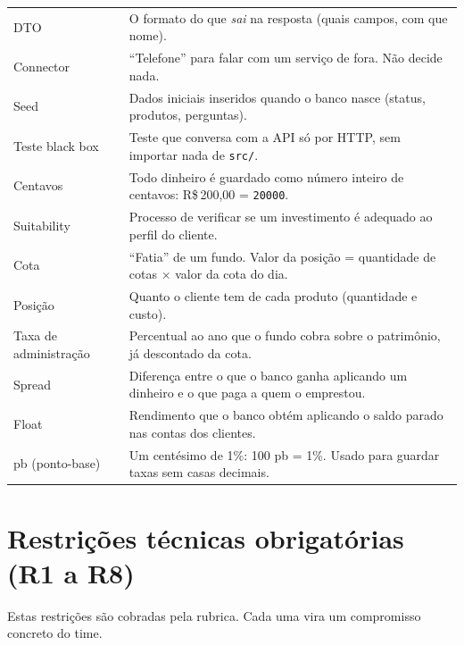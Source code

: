 \documentclass[11pt,a4paper]{article}
\newcommand{\rs}{R\$\,}
\newcommand{\tb}[1]{\texttt{#1}}           %
\begin{document}
\begin{longtable}{@{}P{3.6cm}P{12.5cm}@{}}
DTO & O formato do que \emph{sai} na resposta (quais campos, com que nome). \\
Connector & ``Telefone'' para falar com um serviço de fora. Não decide nada. \\
Seed & Dados iniciais inseridos quando o banco nasce (status, produtos, perguntas). \\
Teste black box & Teste que conversa com a API só por HTTP, sem importar nada de \tb{src/}. \\
Centavos & Todo dinheiro é guardado como número inteiro de centavos: \rs 200,00 = \tb{20000}. \\
Suitability & Processo de verificar se um investimento é adequado ao perfil do cliente. \\
Cota & ``Fatia'' de um fundo. Valor da posição = quantidade de cotas $\times$ valor da cota do dia. \\
Posição & Quanto o cliente tem de cada produto (quantidade e custo). \\
Taxa de administração & Percentual ao ano que o fundo cobra sobre o patrimônio, já descontado da cota. \\
Spread & Diferença entre o que o banco ganha aplicando um dinheiro e o que paga a quem o emprestou. \\
Float & Rendimento que o banco obtém aplicando o saldo parado nas contas dos clientes. \\
pb (ponto-base) & Um centésimo de 1\%: 100 pb = 1\%. Usado para guardar taxas sem casas decimais. \\
\bottomrule
\end{longtable}

\section{Restrições técnicas obrigatórias (R1 a R8)}\label{sec:restricoes}

Estas restrições são cobradas pela rubrica. Cada uma vira um compromisso concreto do time.
\end{document}
